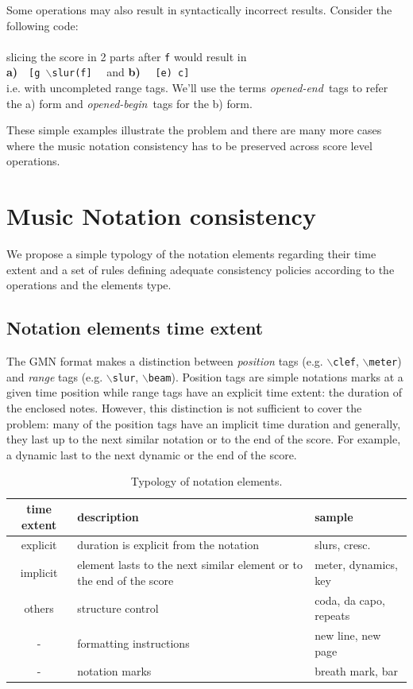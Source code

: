 \documentclass[twoside,10pt,a4paper]{article}
\newcommand{\code}[1]		{{\small \texttt{#1}}}
\newcommand{\gtag}[1]		{$\backslash$\code{#1}}
\newcommand{\oend}			{\emph{opened-end}}
\newcommand{\obeg}			{\emph{opened-begin}}
\newcommand{\codeindent}	{\\ \hspace*{9mm}}
\begin{document}
Some operations may also result in syntactically incorrect results. Consider the following code:
\codeindent \code{[g \gtag{slur}(f e) c]} \\
slicing the score in 2 parts after \code{f} would result in 
\codeindent \textbf{a)}\ \ \code{[g \gtag{slur}(f]} \ \  and \textbf{b)} \ \  \code{[e) c]} \\
i.e. with uncompleted range tags. We'll use the terms \oend\ tags to refer the a) form and \obeg\ tags for the b) form.

These simple examples illustrate the problem and there are many more cases where the music notation consistency has to be preserved across score level operations.

\section{Music Notation consistency}

We propose a simple typology of the notation elements regarding their time extent and a set of rules defining adequate consistency policies according to the operations and the elements type.

\subsection{Notation elements time extent}

The GMN format makes a distinction between \emph{position} tags (e.g. \gtag{clef}, \gtag{meter}) and \emph{range} tags (e.g. \gtag{slur}, \gtag{beam}). Position tags are simple notations marks at a given time position while range tags have an explicit time extent: the duration of the enclosed notes. 
However, this distinction is not sufficient to cover the problem: many of the position tags have an implicit time duration and generally, they last up to the next similar notation or to the end of the score. For example, a dynamic last to the next dynamic or the end of the score.
\begin{table}[htdp]
\begin{center}
\begin{tabular}{cll}
time extent & description & sample \\
\hline
explicit 	& duration is explicit from the notation	& slurs, cresc. \\
implicit 	& element lasts to the next similar element or to the end of the score		& meter, dynamics, key \\
others 		& structure control			& coda, da capo, repeats\\
	- 		& formatting instructions		& new line, new page \\
	- 		& notation marks	& breath mark, bar \\
\hline
\end{tabular}
\end{center}
\caption{Typology of notation elements.}
\label{types}
\end{table}
\end{document}
